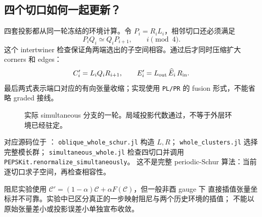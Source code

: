 \subsection{四个切口如何一起更新？}
四套投影都从同一轮冻结的环境计算。令 $P_i=R_iL_i$，相邻切口还必须满足
\[
P_iQ_i\simeq Q_iP_{i+1},\qquad i\pmod 4.
\]
这个 intertwiner 检查保证角两端选出的子空间相容。通过后才同时压缩扩大 corners 和 edges：
\[
C_i'=L_iQ_iR_{i+1},\qquad E_i'=L_{\rm out}\,\widehat E_i\,R_{\rm in}.
\]
最后两式表示端口对应的有向张量收缩；实现使用 \texttt{PL/PR} 的 fusion 形式，不能省略 graded 接线。
\begin{figure}[H]\centering
{}
\caption{实际 simultaneous 分支的一轮。局域投影代数通过，不等于外层环境已经驻定。}
\end{figure}

对应源码位于 ：
\texttt{oblique\_whole\_schur.jl} 构造 $L,R$；
\texttt{whole\_clusters.jl} 选择完整模长群；
\texttt{simultaneous\_whole.jl} 检查四切口并调用
\texttt{PEPSKit.renormalize\_simultaneously}。
这不是完整 periodic-Schur 算法：当前逐切口求子空间，再检查相容性。

阻尼实验使用 $\mathcal C'=(1-\alpha)\mathcal C+\alpha F(\mathcal C)$，但一般非酉 gauge 下
直接插值张量坐标并不可靠。实验中已区分真正的一步映射阻尼与两个历史环境的插值；
不能以原始张量差小或投影误差小单独宣布收敛。

\clearpage
